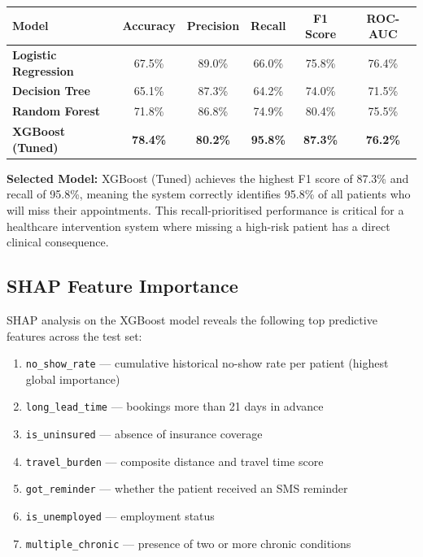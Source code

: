 \documentclass[12pt, a4paper]{report}
\begin{document}
\vspace{0.3cm}
\renewcommand{\arraystretch}{1.7}
\begin{tabularx}{\textwidth}{>{\bfseries}l c c c c c}
  \toprule
  \rowcolor{boxbg}
  \textbf{Model} & \textbf{Accuracy} & \textbf{Precision} & \textbf{Recall} & \textbf{F1 Score} & \textbf{ROC-AUC} \\
  \midrule
  Logistic Regression      & 67.5\% & 89.0\% & 66.0\% & 75.8\% & 76.4\% \\
  Decision Tree            & 65.1\% & 87.3\% & 64.2\% & 74.0\% & 71.5\% \\
  Random Forest            & 71.8\% & 86.8\% & 74.9\% & 80.4\% & 75.5\% \\
  \rowcolor{boxbg}
  \textbf{XGBoost (Tuned)} & \textbf{78.4\%} & \textbf{80.2\%} & \textbf{95.8\%} & \textbf{87.3\%} & \textbf{76.2\%} \\
  \bottomrule
\end{tabularx}
\vspace{0.3cm}

\begin{successbox}
\textbf{Selected Model:} XGBoost (Tuned) achieves the highest F1 score of 87.3\% and recall of 95.8\%, meaning the system correctly identifies 95.8\% of all patients who will miss their appointments. This recall-prioritised performance is critical for a healthcare intervention system where missing a high-risk patient has a direct clinical consequence.
\end{successbox}

\subsection{SHAP Feature Importance}

SHAP analysis on the XGBoost model reveals the following top predictive features across the test set:

\begin{enumerate}
  \item \texttt{no\_show\_rate} --- cumulative historical no-show rate per patient (highest global importance)
  \item \texttt{long\_lead\_time} --- bookings more than 21 days in advance
  \item \texttt{is\_uninsured} --- absence of insurance coverage
  \item \texttt{travel\_burden} --- composite distance and travel time score
  \item \texttt{got\_reminder} --- whether the patient received an SMS reminder
  \item \texttt{is\_unemployed} --- employment status
  \item \texttt{multiple\_chronic} --- presence of two or more chronic conditions
\end{enumerate}
\end{document}
